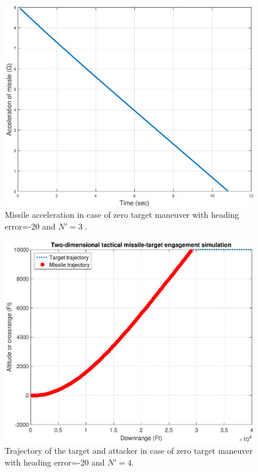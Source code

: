 \begin{figure}[H]
	\centering
	\includegraphics[scale = 0.48]{fig/MissileAccelerationXNT0HE20N3.pdf}
	\caption{Missile acceleration in case of zero target maneuver with heading error=-20 and $N'=3$ .}
	\label{missile acceleration20N3}
\end{figure}


\begin{figure}[H]
	\centering
	\includegraphics[scale = 0.57]{fig/trajectoryXNT0HE20N4.pdf}
	\caption{Trajectory of the target and attacker in case of zero target maneuver with heading error=-20 and $N'=4$.}
	\label{trajectory20N4}
\end{figure}



